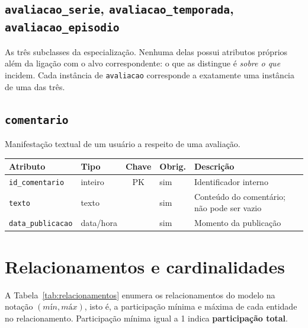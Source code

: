 \documentclass[a4paper,12pt,oneside,openany]{book}
\newcommand{\id}[1]{\texttt{#1}}
\begin{document}
\subsection{\id{avaliacao\_serie}, \id{avaliacao\_temporada}, \id{avaliacao\_episodio}}

As três subclasses da especialização. Nenhuma delas possui atributos próprios além
da ligação com o alvo correspondente: o que as distingue é \emph{sobre o que}
incidem. Cada instância de \id{avaliacao} corresponde a exatamente uma instância
de uma das três.

\subsection{\id{comentario}}

Manifestação textual de um usuário a respeito de uma avaliação.

\begin{table}[H]
\centering
\small
\begin{tabularx}{\textwidth}{@{}llclX@{}}
\toprule
\textbf{Atributo} & \textbf{Tipo} & \textbf{Chave} & \textbf{Obrig.} & \textbf{Descrição} \\
\midrule
\id{id\_comentario} & inteiro & PK & sim & Identificador interno \\
\id{texto} & texto & & sim & Conteúdo do comentário; não pode ser vazio \\
\id{data\_publicacao} & data/hora & & sim & Momento da publicação \\
\bottomrule
\end{tabularx}
\end{table}

\section{Relacionamentos e cardinalidades}\label{sec:relacionamentos}

A Tabela~\ref{tab:relacionamentos} enumera os relacionamentos do modelo na notação
$(\textit{mín},\textit{máx})$, isto é, a participação mínima e máxima de cada
entidade no relacionamento. Participação mínima igual a 1 indica
\textbf{participação total}.
\end{document}
